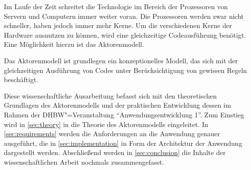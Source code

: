 Im Laufe der Zeit schreitet die Technologie im Bereich der Prozessoren von Servern und Computern immer weiter voran.
Die Prozessoren werden zwar nicht schneller, haben jedoch immer mehr Kerne.
Um die verschiedenen Kerne der Hardware ausnutzen zu können, wird eine gleichzeitige Codeausführung benötigt.
Eine Möglichkeit hierzu ist das Aktorenmodell.

Das Aktorenmodell ist grundlegen ein konzeptionelles Modell, das sich mit der gleichzeitigen Ausführung von Codes unter Berücksichtigung von gewissen Regeln beschäftigt.

Diese wissenschaftliche Ausarbeitung befasst sich mit den theoretischen Grundlagen des Aktorenmodells und der praktischen Entwicklung dessen im Rahmen der DHBW"=Veranstaltung \enquote{Anwendungsentwicklung 1}.
Zum Einstieg wird in \autoref{sec:theory} in die Theorie des Aktorenmodells eingeleitet.
In \autoref{sec:requirements} werden die Anforderungen an die Anwendung genauer ausgeführt, die in \autoref{sec:implementation} in Form der Architektur der Anwendung dargestellt werden.
Abschließend werden in \autoref{sec:conclusion} die Inhalte der wissenschaftlichen Arbeit nochmals zusammengefasst.
